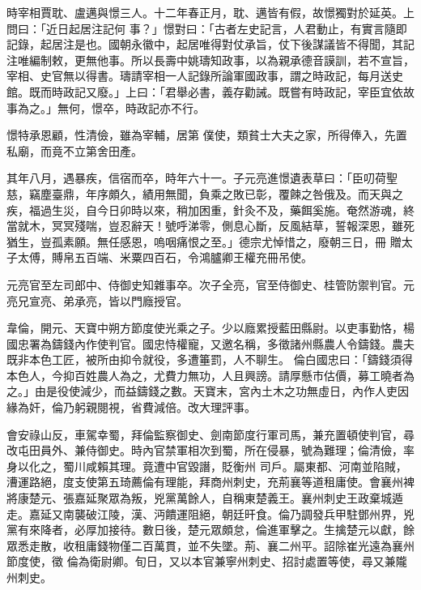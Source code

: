 \begin{pinyinscope}
 時宰相賈耽、盧邁與憬三人。十二年春正月，耽、邁皆有假，故憬獨對於延英。上問曰：「近日起居注記何
 事？」憬對曰：「古者左史記言，人君動止，有實言隨即記錄，起居注是也。國朝永徽中，起居唯得對仗承旨，仗下後謀議皆不得聞，其記注唯編制敕，更無他事。所以長壽中姚璹知政事，以為親承德音謨訓，若不宣旨，宰相、史官無以得書。璹請宰相一人記錄所論軍國政事，謂之時政記，每月送史館。既而時政記又廢。」上曰：「君舉必書，義存勸誡。既嘗有時政記，宰臣宜依故事為之。」無何，憬卒，時政記亦不行。



 憬特承恩顧，性清儉，雖為宰輔，居第
 僕使，類貧士大夫之家，所得俸入，先置私廟，而竟不立第舍田產。



 其年八月，遇暴疾，信宿而卒，時年六十一。子元亮進憬遺表草曰：「臣叨荷聖慈，竊塵臺鼎，年序頗久，績用無聞，負乘之敗已彰，覆餗之咎俄及。而天與之疾，福過生災，自今日卯時以來，稍加困重，針灸不及，藥餌奚施。奄然游魂，終當就木，冥冥殘喘，豈忍辭天！號呼涕零，側息心斷，反風結草，誓報深恩，雖死猶生，豈孤素願。無任感恩，嗚咽痛恨之至。」德宗尤悼惜之，廢朝三日，冊
 贈太子太傅，賻帛五百端、米粟四百石，令鴻臚卿王權充冊吊使。



 元亮官至左司郎中、侍御史知雜事卒。次子全亮，官至侍御史、桂管防禦判官。元亮兄宣亮、弟承亮，皆以門廕授官。



 韋倫，開元、天寶中朔方節度使光乘之子。少以廕累授藍田縣尉。以吏事勤恪，楊國忠署為鑄錢內作使判官。國忠恃權寵，又邀名稱，多徵諸州縣農人令鑄錢。農夫既非本色工匠，被所由抑令就役，多遭箠罰，人不聊生。
 倫白國忠曰：「鑄錢須得本色人，今抑百姓農人為之，尤費力無功，人且興謗。請厚懸市估價，募工曉者為之。」由是役使減少，而益鑄錢之數。天寶末，宮內土木之功無虛日，內作人吏因緣為奸，倫乃躬親閱視，省費減倍。改大理評事。



 會安祿山反，車駕幸蜀，拜倫監察御史、劍南節度行軍司馬，兼充置頓使判官，尋改屯田員外、兼侍御史。時內官禁軍相次到蜀，所在侵暴，號為難理；倫清儉，率身以化之，蜀川咸賴其理。竟遭中官毀譖，貶衡州
 司戶。屬東都、河南並陷賊，漕運路絕，度支使第五琦薦倫有理能，拜商州刺史，充荊襄等道租庸使。會襄州裨將康楚元、張嘉延聚眾為叛，兇黨萬餘人，自稱東楚義王。襄州刺史王政棄城遁走。嘉延又南襲破江陵，漢、沔饋運阻絕，朝廷旰食。倫乃調發兵甲駐鄧州界，兇黨有來降者，必厚加接待。數日後，楚元眾頗怠，倫進軍擊之。生擒楚元以獻，餘眾悉走散，收租庸錢物僅二百萬貫，並不失墜。荊、襄二州平。詔除崔光遠為襄州節度使，徵
 倫為衛尉卿。旬日，又以本官兼寧州刺史、招討處置等使，尋又兼隴州刺史。




\end{pinyinscope}
